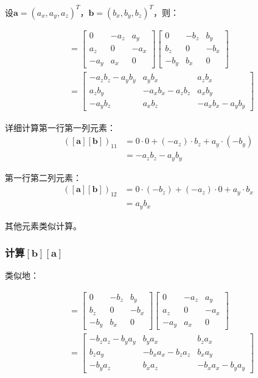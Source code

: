 \documentclass[12pt,a4paper]{article}
\begin{document}
设$\bm{a} = (a_x, a_y, a_z)^T$，$\bm{b} = (b_x, b_y, b_z)^T$，则：

\begin{align}
[\bm{a}][\bm{b}] &= \begin{bmatrix}
0 & -a_z & a_y \\
a_z & 0 & -a_x \\
-a_y & a_x & 0
\end{bmatrix}
\begin{bmatrix}
0 & -b_z & b_y \\
b_z & 0 & -b_x \\
-b_y & b_x & 0
\end{bmatrix} \\
&= \begin{bmatrix}
-a_z b_z - a_y b_y & a_y b_x & a_z b_x \\
a_z b_y & -a_x b_x - a_z b_z & a_x b_y \\
-a_y b_z & a_x b_z & -a_x b_x - a_y b_y
\end{bmatrix}
\label{eq:ab_product}
\end{align}

详细计算第一行第一列元素：
\begin{align}
([\bm{a}][\bm{b}])_{11} &= 0 \cdot 0 + (-a_z) \cdot b_z + a_y \cdot (-b_y) \\
&= -a_z b_z - a_y b_y
\end{align}

第一行第二列元素：
\begin{align}
([\bm{a}][\bm{b}])_{12} &= 0 \cdot (-b_z) + (-a_z) \cdot 0 + a_y \cdot b_x \\
&= a_y b_x
\end{align}

其他元素类似计算。

\subsubsection{计算$[\bm{b}][\bm{a}]$}

类似地：

\begin{align}
[\bm{b}][\bm{a}] &= \begin{bmatrix}
0 & -b_z & b_y \\
b_z & 0 & -b_x \\
-b_y & b_x & 0
\end{bmatrix}
\begin{bmatrix}
0 & -a_z & a_y \\
a_z & 0 & -a_x \\
-a_y & a_x & 0
\end{bmatrix} \\
&= \begin{bmatrix}
-b_z a_z - b_y a_y & b_y a_x & b_z a_x \\
b_z a_y & -b_x a_x - b_z a_z & b_x a_y \\
-b_y a_z & b_x a_z & -b_x a_x - b_y a_y
\end{bmatrix}
\label{eq:ba_product}
\end{align}
\end{document}
